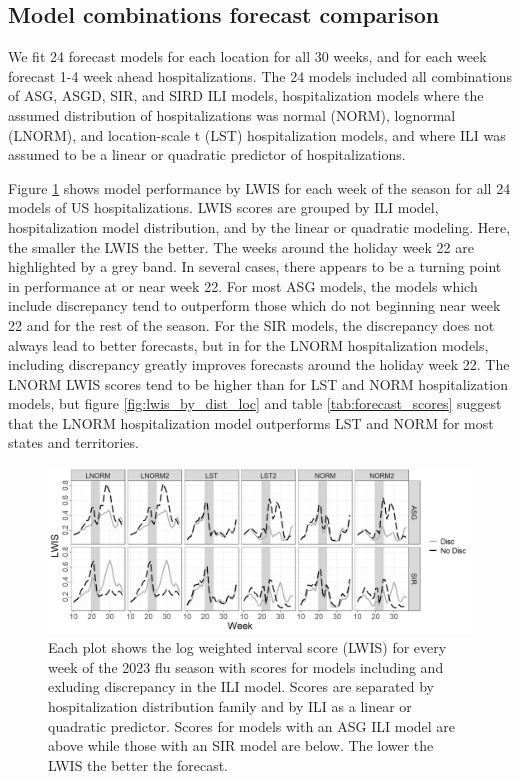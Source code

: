 \documentclass[ba]{imsart}
\theoremstyle{plain}
\theoremstyle{definition}
\theoremstyle{remark}
\begin{document}
\begin{supplement}
\newpage
\section{Model combinations forecast comparison}

We fit 24 forecast models for each location for all 30 weeks, and for each 
week forecast 1-4 week ahead hospitalizations. The 24 models included all 
combinations of ASG, ASGD, SIR, and SIRD ILI models, hospitalization
models where the assumed distribution of 
hospitalizations was normal (NORM), lognormal (LNORM), 
and location-scale t (LST)
hospitalization models, and where ILI was assumed to be a linear or 
quadratic predictor of hospitalizations.

Figure \ref{fig:us_lwis} shows model performance by LWIS for each week of the 
season for all 24 models of US hospitalizations. LWIS scores are grouped by 
ILI model, hospitalization model distribution, and by the linear or quadratic 
modeling. Here, the smaller the LWIS the better. The weeks around the holiday 
week 22 are highlighted by a grey band. 
In several cases, there appears to be a turning point in performance at or 
near week 22. For most ASG models, the models which include discrepancy tend 
to outperform those which do not beginning near week 22 and for the rest of 
the season.
For the SIR models, the discrepancy does not always lead to better forecasts, 
but in for the LNORM hospitalization models, including discrepancy greatly 
improves forecasts around the holiday week 22. The LNORM LWIS scores tend to 
be higher than for LST and NORM hospitalization models, but figure 
\ref{fig:lwis_by_dist_loc} and table \ref{tab:forecast_scores} suggest that 
the LNORM hospitalization model outperforms LST and NORM for most states and 
territories.


\begin{figure}[hbt!]
    
    \includegraphics[scale = .5]{Images/lwis_ln_us_full_season.png}
    \caption{Each plot shows the log weighted interval score (LWIS) for every 
    week of the 2023 flu season with scores for models including and exluding 
    discrepancy in the ILI model. Scores are separated by hospitalization 
    distribution family and by ILI as a linear or quadratic predictor. Scores 
    for models with an ASG ILI model are above while those with an SIR model 
    are below. The lower the LWIS the better the forecast.}
    \label{fig:us_lwis}
\end{figure}



\end{supplement}
\end{document}
